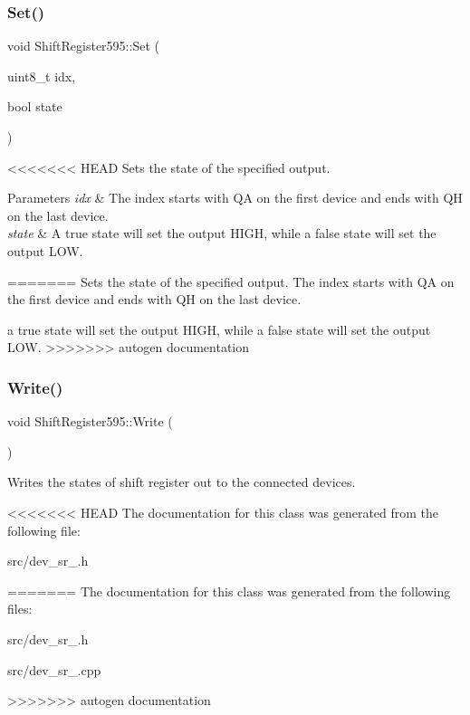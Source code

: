 \subsubsection{\texorpdfstring{Set()}{Set()}}
{\footnotesize\ttfamily void Shift\+Register595\+::\+Set (\begin{DoxyParamCaption}\item[{uint8\+\_\+t}]{idx,  }\item[{bool}]{state }\end{DoxyParamCaption})}

<<<<<<< HEAD
Sets the state of the specified output. 
\begin{DoxyParams}{Parameters}
{\em idx} & The index starts with QA on the first device and ends with QH on the last device. \\
\hline
{\em state} & A true state will set the output H\+I\+GH, while a false state will set the output L\+OW. \\
\hline
\end{DoxyParams}
\mbox{\label{class_shift_register595_a9946a50af186043d5532a9ec10b404b7}} 
=======
Sets the state of the specified output. The index starts with QA on the first device and ends with QH on the last device.

a true state will set the output H\+I\+GH, while a false state will set the output L\+OW. \mbox{\label{class_shift_register595_a9946a50af186043d5532a9ec10b404b7}} 
>>>>>>> autogen documentation
\subsubsection{\texorpdfstring{Write()}{Write()}}
{\footnotesize\ttfamily void Shift\+Register595\+::\+Write (\begin{DoxyParamCaption}{ }\end{DoxyParamCaption})}

Writes the states of shift register out to the connected devices. 

<<<<<<< HEAD
The documentation for this class was generated from the following file\+:\begin{DoxyCompactItemize}
\item 
src/dev\+\_\+sr\+\_.\+h\end{DoxyCompactItemize}
=======
The documentation for this class was generated from the following files\+:\begin{DoxyCompactItemize}
\item 
src/dev\+\_\+sr\+\_.\+h\item 
src/dev\+\_\+sr\+\_.\+cpp\end{DoxyCompactItemize}
>>>>>>> autogen documentation
